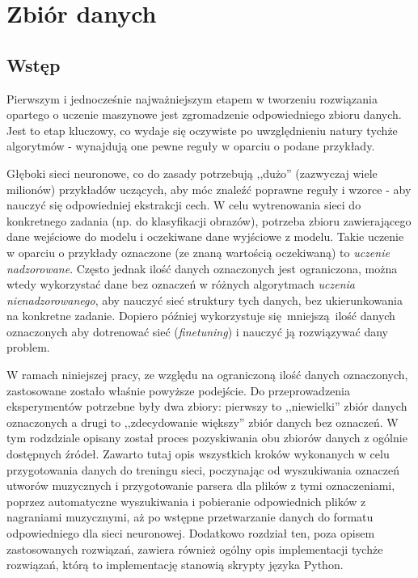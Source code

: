\chapter{Zbiór danych}

\section{Wstęp}

Pierwszym i jednocześnie najważniejszym etapem w tworzeniu rozwiązania opartego o uczenie maszynowe
jest zgromadzenie odpowiedniego zbioru danych. Jest to etap kluczowy, co wydaje się oczywiste po
uwzględnieniu natury tychże algorytmów - wynajdują one pewne reguły w oparciu o podane przykłady.

Głęboki sieci neuronowe, co do zasady potrzebują ,,dużo'' (zazwyczaj wiele milionów) przykładów
uczących, aby móc znaleźć poprawne reguły i wzorce - aby nauczyć się odpowiedniej ekstrakcji cech. W
celu wytrenowania sieci do konkretnego zadania (np. do klasyfikacji obrazów), potrzeba zbioru
zawierającego dane wejściowe do modelu i oczekiwane dane wyjściowe z modelu. Takie uczenie w oparciu
o przykłady oznaczone (ze znaną wartością oczekiwaną) to \emph{uczenie nadzorowane}. Często jednak
ilość danych oznaczonych jest ograniczona, można wtedy wykorzystać dane bez oznaczeń w różnych
algorytmach \emph{uczenia nienadzorowanego}, aby nauczyć sieć struktury tych danych, bez
ukierunkowania na konkretne zadanie. Dopiero później wykorzystuje się mniejszą ilość danych
oznaczonych aby dotrenować sieć (\emph{finetuning}) i nauczyć ją rozwiązywać dany problem.

W ramach niniejszej pracy, ze względu na ograniczoną ilość danych oznaczonych, zastosowane zostało
właśnie powyższe podejście. Do przeprowadzenia eksperymentów potrzebne były dwa zbiory: pierwszy to
,,niewielki'' zbiór danych oznaczonych a drugi to ,,zdecydowanie większy'' zbiór danych bez
oznaczeń. W tym rodzdziale opisany został proces pozyskiwania obu zbiorów danych z ogólnie
dostępnych źródeł. Zawarto tutaj opis wszystkich kroków wykonanych w celu przygotowania danych do
treningu sieci, poczynając od wyszukiwania oznaczeń utworów muzycznych i przygotowanie parsera dla
plików z tymi oznaczeniami, poprzez automatyczne wyszukiwania i pobieranie odpowiednich plików z
nagraniami muzycznymi, aż po wstępne przetwarzanie danych do formatu odpowiedniego dla sieci
neuronowej. Dodatkowo rozdział ten, poza opisem zastosowanych rozwiązań, zawiera również ogólny opis
implementacji tychże rozwiązań, którą to implementację stanowią skrypty języka Python.


